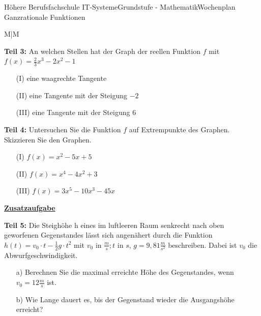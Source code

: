 \documentclass[oneside,openany,headings=optiontotoc,11pt,numbers=noenddot]{scrreprt}
\begin{document}
\begin{worksheet}{Höhere Berufsfachschule IT-Systeme}{Grundstufe - Mathematik}{Wochenplan Ganzrationale Funktionen}
\begin{framed}
\begin{tabularx}{\textwidth}{M|M}
				\hline
				\\
			\end{tabularx}
		\end{framed}
		\normalsize
		\begin{framed}
			\noindent
			\textbf{Teil 3:} An welchen Stellen hat der Graph der reellen Funktion \(f\) mit \(f(x) = \frac{2}{3}x^3 - 2x^2 -1\)
			\begin{itemize}
				\item[(I)] eine waagrechte Tangente
				\item[(II)] eine Tangente mit der Steigung \(-2\)
				\item[(III)] eine Tangente mit der Steigung \(6\)
			\end{itemize}
		\end{framed}
		\begin{framed}
			\noindent
			\textbf{Teil 4:} Untersuchen Sie die Funktion \(f\) auf Extrempunkte des Graphen. Skizzieren Sie den Graphen.
			\begin{itemize}
				\item[(I)] \(f(x) = x^2 - 5x + 5\)
				\item[(II)] \(f(x) = x^4-4x^2 + 3\)
				\item[(III)] \(f(x) = 3x^5-10x^3 - 45x\)
			\end{itemize}
		\end{framed}
		\begin{framed}
			\noindent
			\textbf{\underline{Zusatzaufgabe}}\\
			\par\noindent
			\textbf{Teil 5:} Die Steighöhe h eines im luftleeren Raum senkrecht nach oben geworfenen Gegenstandes lässt sich angenähert durch die Funktion \(h(t) = v_0\cdot{}t - \frac{1}{2}g\cdot{}t^2\) mit \(v_0\) in \(\frac{m}{s}; t\) in \(s\), \(g = 9,81 \frac{m}{s^2}\) beschreiben. Dabei ist \(v_0\) die Abwurfgeschwindigkeit.
			\begin{itemize}
				\item[a)] Berechnen Sie die maximal erreichte Höhe des Gegenstandes, wenn \(v_0 = 12 \frac{m}{s}\) ist.
				\item[b)] Wie Lange dauert es, bis der Gegenstand wieder die Ausgangshöhe erreicht?
			\end{itemize}
		\end{framed}
	\end{worksheet}
\end{document}

